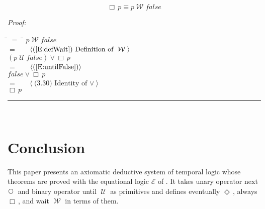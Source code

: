 \documentclass[fleqn, leqno]{article}
\newcommand{\lgap}{2pt} %
\newcommand{\mymathindent}{24pt} %
\newcommand{\Until}{\;\mathcal{U}\;}
\newcommand{\Wait}{\;\mathcal{W}\;}
\newcommand{\Next}{\;\,\text{\raisebox{3.5pt}{\circle{6}}}}
\newcommand{\Event}{\Diamond\,}
\newcommand{\Always}{\Box\,}
\newcommand{\myqed}{\hfill\rule[-.23ex]{1.2ex}{2.0ex}}
\newcommand{\Gll} {\langle} %
\newcommand{\Ggg} {\rangle} %
\newcommand{\Hint}[1] {\ \ \ $\Gll \mbox{#1} \Ggg$ } %
\begin{document}
\begin{equation}\label{E:alwaysAsWait}
\Always p \equiv p \Wait false
\end{equation}

\emph{Proof:}
\begin{tabbing}
\hspace{\mymathindent} \= $= \;$ \= \kill
\> \> $p \Wait false$\\[\lgap]
\> $=$ \> \Hint{(\ref{E:defWait}) Definition of $\Wait$} \\[\lgap]
\> \> $(p \Until false) \lor \Always p$\\[\lgap]
\> $=$ \> \Hint{(\ref{E:untilFalse})} \\[\lgap]
\> \> $false \lor \Always p$\\[\lgap]
\> $=$ \> \Hint{(3.30) Identity of $\lor$} \\[\lgap]
\> \> $\Always p$\\[\lgap]
\end{tabbing}
\myqed\\[\lgap]


\section{Conclusion}

This paper presents an axiomatic deductive system of temporal logic whose theorems are proved with the equational
logic $\mathcal{E}$ of \cite{LADM}.
It takes unary operator next $\Next$ and binary operator until $\Until$ as primitives and defines
eventually $\Event$, always $\Always$, and wait $\Wait$ in terms of them.



\end{document}
